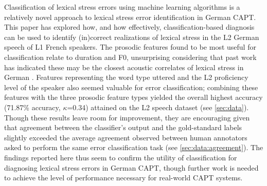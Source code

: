 \documentclass[a4paper]{article}
\begin{document}
		Classification of lexical stress errors using machine learning algorithms is a relatively novel approach to lexical stress error identification in German CAPT.
		This paper has 
		explored  
		how, and how effectively, classification-based diagnosis can be used to identify (in)correct realizations of lexical stress in the L2 German speech of L1 French speakers. 
		The prosodic features found to be most useful for classification relate to duration and F0, unsurprising considering that past work has indicated these may be the closest acoustic correlates of lexical stress in German \cite{Dogil1999,Cutler2005}. 
		Features representing the word type uttered and the L2 proficiency level of the speaker also seemed valuable for error classification; combining these features with the three prosodic feature types yielded the overall highest accuracy (71.87\% accuracy, $\kappa$=0.34) attained on the L2 speech dataset (see \cref{sec:data}).
		Though these results leave room for improvement, they are encouraging given that agreement between the classifier's output and the gold-standard labels slightly exceeded the average agreement observed between human annotators asked to perform the same error classification task (see \cref{sec:data:agreement}).
		The findings reported here thus seem to confirm the utility of classification for diagnosing lexical stress errors in German CAPT, though further work is needed to achieve the level of performance necessary for real-world CAPT systems.
	
\end{document}
